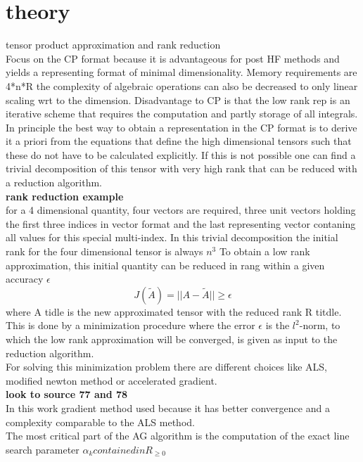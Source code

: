 \documentclass[10pt, draft]{article}
\begin{document}
 
 \section{theory}
 tensor product approximation and rank reduction\\
 Focus on the CP format because it is advantageous for post HF methods and yields a representing format of minimal dimensionality.  Memory requirements are 4*n*R the complexity of algebraic operations can also be decreased to only linear scaling wrt to the dimension. Disadvantage to CP is that the low rank rep is an iterative scheme that requires the computation and partly storage of all integrals.  \\
 In principle the best way to obtain a representation in the CP format is to derive it a priori from the equations that define the high dimensional tensors such that these do not have to be calculated explicitly.  If this is not possible one can find a trivial decomposition of this tensor with very high rank that can be reduced with a reduction algorithm.\\
\textbf{rank reduction example}\\
for a 4 dimensional quantity, four vectors are required, three unit vectors holding the first three indices in vector format and the last representing vector contaning all values for this special multi-index.  In this trivial decomposition the initial rank for the four dimensional tensor is always $n^3$ To obtain a low rank approximation, this initial quantity can be reduced in rang within a given accuracy $\epsilon$
\[J(\tilde{A}) = || A - \tilde{A}|| \geq \epsilon\]
where A tidle is the new approximated tensor with the reduced rank R titdle.  This is done by a minimization procedure where the error $\epsilon$ is the $l^2$-norm, to which the low rank approximation will be converged, is given as input to the reduction algorithm.\\
For solving this minimization problem there are different choices like ALS, modified newton method or accelerated gradient.\\
\textbf{look to source 77 and 78}\\
In this work gradient method used because it has better convergence and a complexity comparable to the ALS method.  \\
The most critical part of the AG algorithm is the computation of the exact line search parameter $\alpha_k contained in R_{\geq 0}$\\
\end{document}
